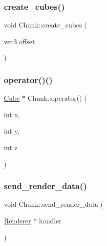 \mbox{\label{classChunk_af2b7c93af8b369467a86687e2afde029}} 
\subsubsection{\texorpdfstring{create\+\_\+cubes()}{create\_cubes()}}
{\footnotesize\ttfamily void Chunk\+::create\+\_\+cubes (\begin{DoxyParamCaption}\item[{vec3}]{offset }\end{DoxyParamCaption})}

\mbox{\label{classChunk_aa95ae810408dd656b8b750c6baf42e1d}} 
\subsubsection{\texorpdfstring{operator()()}{operator()()}}
{\footnotesize\ttfamily \mbox{\hyperlink{classCube}{Cube}} $\ast$ Chunk\+::operator() (\begin{DoxyParamCaption}\item[{int}]{x,  }\item[{int}]{y,  }\item[{int}]{z }\end{DoxyParamCaption})}

\mbox{\label{classChunk_aca780fcf47255bd05242ba1d144d0672}} 
\subsubsection{\texorpdfstring{send\+\_\+render\+\_\+data()}{send\_render\_data()}}
{\footnotesize\ttfamily void Chunk\+::send\+\_\+render\+\_\+data (\begin{DoxyParamCaption}\item[{\mbox{\hyperlink{classRenderer}{Renderer}} $\ast$}]{handler }\end{DoxyParamCaption})\hspace{0.3cm}{\ttfamily [inline]}}

\mbox{\label{classChunk_a1cbe00cb7683d46b86908f29fe066f5b}} 
